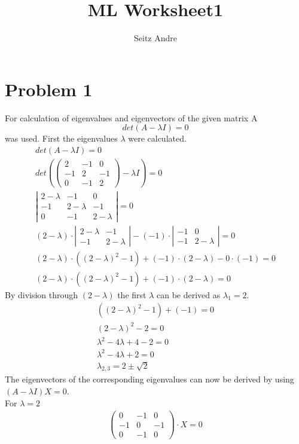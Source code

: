 \documentclass[12pt,a4paper]{report}
\author{Seitz Andre}
\title{ML Worksheet1}
\begin{document}
\section{Problem 1}
For calculation of eigenvalues and eigenvectors of the given matrix A
\begin{equation}
det(A-\lambda I) = 0
\end{equation}
was used. First the eigenvalues $\lambda$ were calculated.
\begin{eqnarray}
det ( A - \lambda I ) = 0 \\
det ( \left(
\begin{array}{ccc}
2 & -1 & 0 \\
-1 & 2 & -1 \\
0 & -1 & 2
\end{array}
\right) - \lambda I ) = 0 \\
\left|
\begin{array}{ccc}
2-\lambda & -1 & 0 \\
-1 & 2-\lambda & -1 \\
0 & -1 & 2-\lambda 
\end{array}
\right| = 0 \\
(2-\lambda) \cdot \left|
\begin{array}{cc}
2-\lambda & -1 \\
-1 & 2-\lambda 
\end{array} \right|
- (-1) \cdot \left|
\begin{array}{cc}
-1 & 0 \\
-1 & 2-\lambda
\end{array} \right| = 0 \\
(2-\lambda)\cdot((2-\lambda)^2-1)+(-1)\cdot(2-\lambda)-0\cdot(-1) = 0\\
(2-\lambda)\cdot((2-\lambda)^2-1)+(-1)\cdot(2-\lambda) = 0
\end{eqnarray}
By division through $(2- \lambda)$ the first $\lambda$ can be derived as $\lambda_1 = 2$.
\begin{eqnarray}
((2-\lambda)^2-1)+(-1) = 0 \\
(2-\lambda)^2-2 = 0 \\
\lambda^2-4\lambda+4-2 = 0 \\
\lambda^2-4\lambda+2 = 0 \\
\lambda_{2,3} = 2\pm \sqrt{2}
\end{eqnarray}
The eigenvectors of the corresponding eigenvalues can now be derived by using $(A - \lambda I)X = 0$. \\
For $\lambda = 2$
\begin{eqnarray}
\left(
\begin{array}{ccc}
0 & -1 & 0 \\
-1 & 0 & -1 \\
0 & -1 & 0
\end{array} \right) \cdot X = 0
\end{eqnarray}
\end{document}
